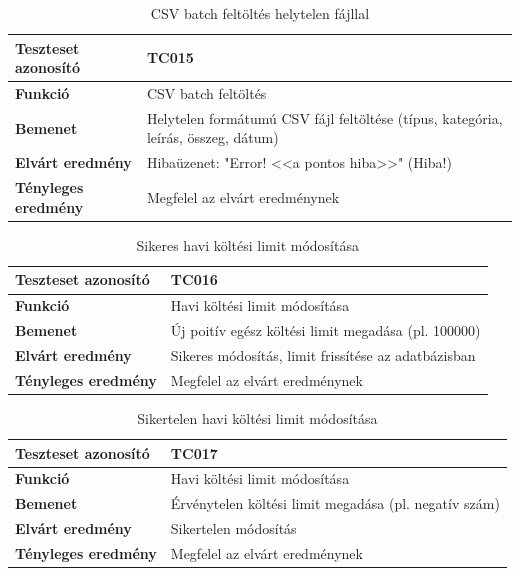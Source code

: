 \begin{table}[h!]
	\centering
	\begin{tabular}{|l|p{10cm}|}
		\hline
		\textbf{Teszteset azonosító} & TC015 \\ \hline
		\textbf{Funkció} & CSV batch feltöltés \\ \hline
		\textbf{Bemenet} & Helytelen formátumú CSV fájl feltöltése (típus, kategória, leírás, összeg, dátum) \\ \hline
		\textbf{Elvárt eredmény} & Hibaüzenet: "Error! <<a pontos hiba>>" (Hiba!) \\ \hline
		\textbf{Tényleges eredmény} & Megfelel az elvárt eredménynek \\ \hline
	\end{tabular}
	\caption{CSV batch feltöltés helytelen fájllal}
	\label{tab:csv_feltoltes_helytelen}
\end{table}

\begin{table}[h!]
	\centering
	\begin{tabular}{|l|p{10cm}|}
		\hline
		\textbf{Teszteset azonosító} & TC016 \\ \hline
		\textbf{Funkció} & Havi költési limit módosítása \\ \hline
		\textbf{Bemenet} & Új poitív egész költési limit megadása (pl. 100000) \\ \hline
		\textbf{Elvárt eredmény} & Sikeres módosítás, limit frissítése az adatbázisban \\ \hline
		\textbf{Tényleges eredmény} & Megfelel az elvárt eredménynek \\ \hline
	\end{tabular}
	\caption{Sikeres havi költési limit módosítása}
	\label{tab:havi_limit_modositas}
\end{table}
\begin{table}[h!]
	\centering
	\begin{tabular}{|l|p{10cm}|}
		\hline
		\textbf{Teszteset azonosító} & TC017 \\ \hline
		\textbf{Funkció} & Havi költési limit módosítása \\ \hline
		\textbf{Bemenet} & Érvénytelen költési limit megadása (pl. negatív szám)\\ \hline
		\textbf{Elvárt eredmény} & Sikertelen módosítás \\ \hline
		\textbf{Tényleges eredmény} & Megfelel az elvárt eredménynek \\ \hline
	\end{tabular}
	\caption{Sikertelen havi költési limit módosítása}
	\label{tab:havi_limit_modositas_sikertelen}
\end{table}

